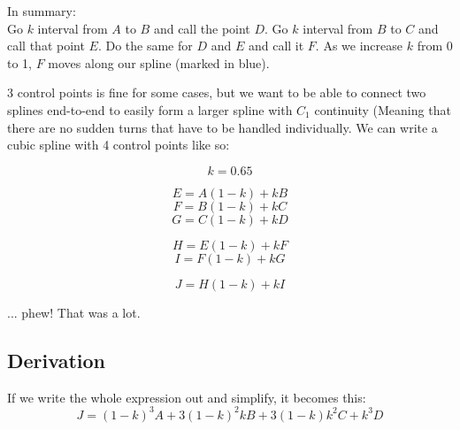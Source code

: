 \documentclass[12pt, english]{article}
\begin{document}
In summary: \\
Go $k$ interval from $A$ to $B$ and call the point $D$. Go $k$ interval from $B$ to $C$ and call that point $E$. Do the same for $D$ and $E$ and call it $F$. As we increase $k$ from 0 to 1, $F$ moves along our spline (marked in blue). \\
\par
3 control points is fine for some cases, but we want to be able to connect two splines end-to-end to easily form a larger spline with $C_1$ continuity (Meaning that there are no sudden turns that have to be handled individually. We can write a cubic spline with 4 control points like so:
\begin{center}
	\[ k = 0.65 \]
\end{center}

\[ E = A(1-k) + kB \]
\[ F = B(1-k) + kC \]
\[ G = C(1-k) + kD \]

\[ H = E(1-k) + kF \]
\[ I = F(1-k) + kG \]

\[ J = H(1-k) + kI \]

... phew! That was a lot. \\
\par

\subsection{Derivation}
If we write the whole expression out and simplify, it becomes this:
\[
	J=(1-k)^{3} A+3(1-k)^{2}k B+3(1-k)k^{2} C+k^{3}D
\]
\end{document}
